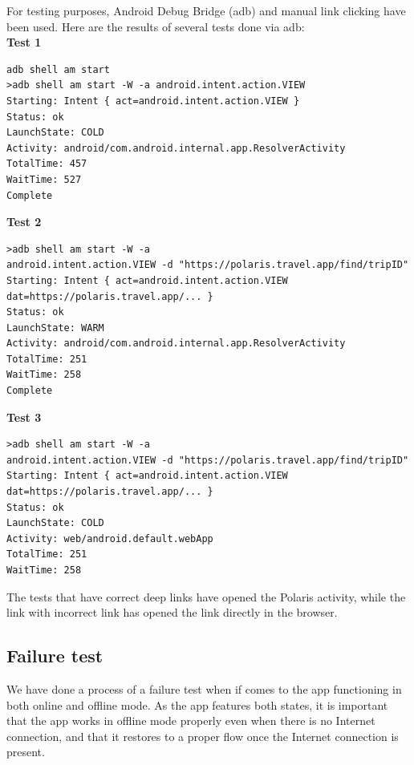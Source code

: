 For testing purposes, Android Debug Bridge (adb) and manual link clicking have been used. Here are the results of several tests done via adb:\\

\textbf{Test 1}
\begin{verbatim}
adb shell am start
>adb shell am start -W -a android.intent.action.VIEW
Starting: Intent { act=android.intent.action.VIEW }
Status: ok
LaunchState: COLD
Activity: android/com.android.internal.app.ResolverActivity
TotalTime: 457
WaitTime: 527
Complete
\end{verbatim}

\textbf{Test 2}
\begin{verbatim}
>adb shell am start -W -a 
android.intent.action.VIEW -d "https://polaris.travel.app/find/tripID"
Starting: Intent { act=android.intent.action.VIEW dat=https://polaris.travel.app/... }
Status: ok
LaunchState: WARM
Activity: android/com.android.internal.app.ResolverActivity
TotalTime: 251
WaitTime: 258
Complete
\end{verbatim}

\textbf{Test 3}
\begin{verbatim}
>adb shell am start -W -a 
android.intent.action.VIEW -d "https://polaris.travel.app/find/tripID"
Starting: Intent { act=android.intent.action.VIEW dat=https://polaris.travel.app/... }
Status: ok
LaunchState: COLD
Activity: web/android.default.webApp
TotalTime: 251
WaitTime: 258
\end{verbatim}

The tests that have correct deep links have opened the Polaris activity, while the link with incorrect link has opened the 
link directly in the browser.

\newpage
\subsection{Failure test}
We have done a process of a failure test when if comes to the app functioning in both online and offline mode. As the app features both states, it is important that the app works in offline mode properly even when there is no Internet connection, and that it restores to a proper flow once the Internet connection is present.\\

